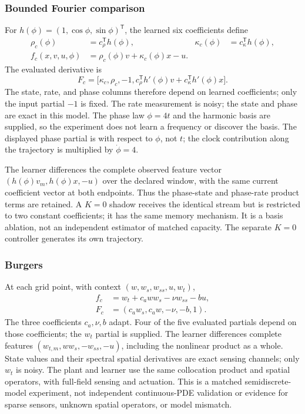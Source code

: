 \documentclass[journal]{IEEEtran}
\begin{document}
\subsubsection{Bounded Fourier comparison}
For $h(\phi)=(1,\cos\phi,\sin\phi)^{\mathsf T}$,
the learned six coefficients define
\begin{align}
 \rho_c(\phi)&=c_\rho^{\mathsf T}h(\phi),&
 \kappa_c(\phi)&=c_\kappa^{\mathsf T}h(\phi),\\
 f_c(x,v,u,\phi)&=\rho_c(\phi)v+\kappa_c(\phi)x-u.
\end{align}
The evaluated derivative is
\begin{equation}
 F_c=\bigl[\kappa_c,\rho_c,-1,
 c_\rho^{\mathsf T}h'(\phi)v+c_\kappa^{\mathsf T}h'(\phi)x\bigr].
 \label{eq:audit_fourier_partials}
\end{equation}
The state, rate, and phase columns therefore depend on learned coefficients;
only the input partial $-1$ is fixed. The rate measurement is noisy; the
state and phase are exact in this model. The phase law $\phi=4t$ and the
harmonic basis are supplied, so the experiment does not learn a frequency
or discover the basis. The displayed phase partial is with respect to
$\phi$, not $t$; the clock contribution along the trajectory is multiplied
by $\dot\phi=4$.

The learner differences the complete observed feature vector
$(h(\phi)v_m,h(\phi)x,-u)$ over the declared window, with the same current
coefficient vector at both endpoints. Thus the phase-state and phase-rate
product terms are retained. A $K=0$ shadow receives the identical stream
but is restricted to two constant coefficients; it has the same memory
mechanism. It is a basis ablation, not an independent estimator of matched
capacity. The separate $K=0$ controller generates its own trajectory.

\subsubsection{Burgers}
At each grid point, with context $(w,w_s,w_{ss},u,w_t)$,
\begin{align}
 f_c&=w_t+c_a w w_s-\nu w_{ss}-bu,\\
 F_c&=(c_a w_s,c_a w,-\nu,-b,1).
 \label{eq:audit_burgers_partials}
\end{align}
The three coefficients $c_a,\nu,b$ adapt. Four of the five evaluated
partials depend on those coefficients; the $w_t$ partial is supplied.
The learner differences complete features $(w_{t,m},ww_s,-w_{ss},-u)$,
including the nonlinear product as a whole. State values and their
spectral spatial derivatives are exact sensing channels; only $w_t$ is
noisy. The plant and learner use the same collocation product and spatial
operators, with full-field sensing and actuation. This is a matched
semidiscrete-model experiment, not independent continuous-PDE validation
or evidence for sparse sensors, unknown spatial operators, or model mismatch.
\end{document}
